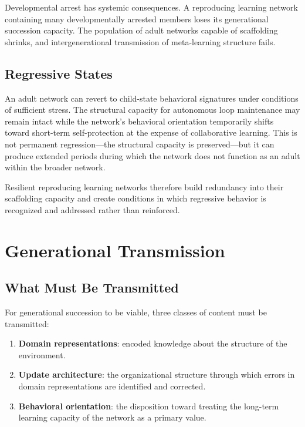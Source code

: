 \documentclass[11pt]{article}
\begin{document}
Developmental arrest has systemic consequences. A reproducing learning network containing
many developmentally arrested members loses its generational succession capacity. The
population of adult networks capable of scaffolding shrinks, and intergenerational
transmission of meta-learning structure fails.

\subsection{Regressive States}

An adult network can revert to child-state behavioral signatures under conditions of
sufficient stress. The structural capacity for autonomous loop maintenance may remain intact
while the network's behavioral orientation temporarily shifts toward short-term
self-protection at the expense of collaborative learning. This is not permanent
regression---the structural capacity is preserved---but it can produce extended periods
during which the network does not function as an adult within the broader network.

Resilient reproducing learning networks therefore build redundancy into their scaffolding
capacity and create conditions in which regressive behavior is recognized and addressed
rather than reinforced.

\section{Generational Transmission}

\subsection{What Must Be Transmitted}

For generational succession to be viable, three classes of content must be transmitted:

\begin{enumerate}
    \item \textbf{Domain representations}: encoded knowledge about the structure of the
          environment.
    \item \textbf{Update architecture}: the organizational structure through which errors in
          domain representations are identified and corrected.
    \item \textbf{Behavioral orientation}: the disposition toward treating the long-term
          learning capacity of the network as a primary value.
\end{enumerate}
\end{document}
